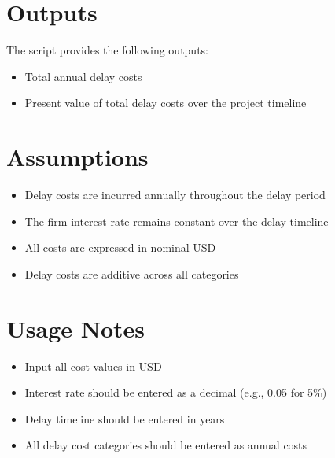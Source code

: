\documentclass[12pt]{article}
\begin{document}
\section{Outputs}

The script provides the following outputs:
\begin{itemize}
    \item Total annual delay costs
    \item Present value of total delay costs over the project timeline
\end{itemize}

\section{Assumptions}

\begin{itemize}
    \item Delay costs are incurred annually throughout the delay period
    \item The firm interest rate remains constant over the delay timeline
    \item All costs are expressed in nominal USD
    \item Delay costs are additive across all categories
\end{itemize}

\section{Usage Notes}

\begin{itemize}
    \item Input all cost values in USD
    \item Interest rate should be entered as a decimal (e.g., 0.05 for 5\%)
    \item Delay timeline should be entered in years
    \item All delay cost categories should be entered as annual costs
\end{itemize}
\end{document}
